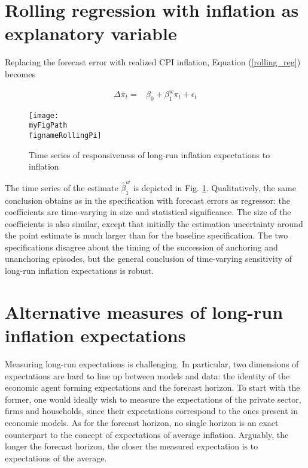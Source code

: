 \documentclass[11pt]{article}
\def \myFigPath {../../figures/}
\renewcommand{\[}{\begin{equation}}
\renewcommand{\]}{\end{equation}}
\def\fignameRollingPi{rolling_overlapping_pi_command_anchoring_in_data_individual_25_Sep_2020_10_37_43} %
\begin{document}
\newpage
\appendix


\section{Rolling regression with inflation as explanatory variable}\label{app_rolling_pi}

Replacing the forecast error with realized CPI inflation, Equation (\ref{rolling_reg}) becomes 

\begin{align*}
\Delta\bar{\pi}_t = & \beta_0 + \beta^w_1 \pi_t + \epsilon_t 
\label{rolling_reg_pi}
\end{align*}

\begin{figure}[h!]
\texttt{[image: \\myFigPath \\fignameRollingPi]}
\caption{Time series of responsiveness of long-run inflation expectations to inflation}
\label{rolling_pi}
\end{figure}

The time series of the estimate $\hat{\beta}^w_1$ is depicted in Fig. \ref{rolling_pi}. Qualitatively, the same conclusion obtains as in the specification with forecast errors as regressor: the coefficients are time-varying in size and statistical significance. The size of the coefficients is also similar, except that initially the estimation uncertainty around the point estimate is much larger than for the baseline specification. The two specifications disagree about the timing of the succession of anchoring and unanchoring episodes, but the general conclusion of time-varying sensitivity of long-run inflation expectations is robust. 


\section{Alternative measures of long-run inflation expectations}\label{unanchoring_in_data}

Measuring long-run expectations is challenging. In particular, two dimensions of expectations are hard to line up between models and data: the identity of the economic agent forming expectations and the forecast horizon. To start with the former, one would ideally wish to measure the expectations of the private sector, firms and households, since their expectations correspond to the ones present in economic models. As for the forecast horizon, no single horizon is an exact counterpart to the concept of expectations of average inflation. Arguably, the longer the forecast horizon, the closer the measured expectation is to expectations of the average.
\end{document}
